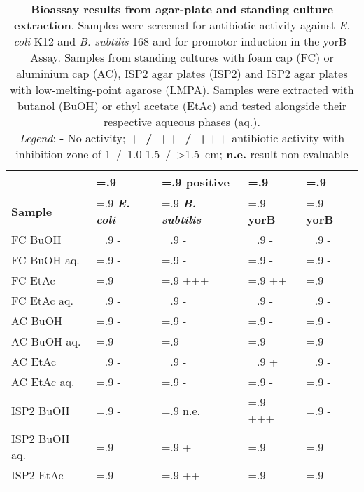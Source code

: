     \begin{table}[htbp]
        \caption[Bioassay results from agar-plate and standing culture extraction]{%
        	\textbf{Bioassay results from agar-plate and standing culture extraction}.
	        Samples were screened for antibiotic activity against \textit{E. coli} K12 and \textit{B. subtilis} 168 and for promotor induction in the yorB-Assay.
	        Samples from standing cultures with foam cap (FC) or aluminium cap (AC), ISP2 agar plates (ISP2) and ISP2 agar plates with low-melting-point agarose (LMPA).
	        Samples were extracted with butanol (BuOH) or ethyl acetate (EtAc) and tested alongside their respective aqueous phases (aq.).\\
	        \emph{Legend}: \textbf{-} No activity; \textbf{+~/~++~/~+++} antibiotic activity with inhibition zone of 1~/~1.0-1.5~/~>1.5~cm; \textbf{n.e.} result non-evaluable}
        \label{tab:yorB_assay_results}
        \centering
        \begin{tabularx}{\textwidth}{>{\hsize=1.4\hsize}X>{\hsize=.9\hsize}X>{\hsize=.9\hsize}X>{\hsize=.9\hsize}X>{\hsize=.9\hsize}X}
            \toprule
            & \multicolumn{3}{c}{Antibacterial} & positive \\
            \cline{2-4}
            \textbf{Sample} & \textbf{\textit{E. coli}}     & \textbf{\textit{B. subtilis}}  & \textbf{yorB}  & \textbf{yorB}    \\
            \midrule
            FC BuOH         & -     & -     & -     & -    \\
            FC BuOH aq.     & -     & -     & -     & -    \\
            FC EtAc         & -     & +++   & ++    & -    \\
            FC EtAc aq.     & -     & -     & -     & -    \\
            AC BuOH         & -     & -     & -     & -    \\
            AC BuOH aq.     & -     & -     & -     & -    \\
            AC EtAc         & -     & -     & +     & -    \\
            AC EtAc aq.     & -     & -     & -     & -    \\
            \midrule
            ISP2 BuOH       & -     & n.e.  & +++   & -    \\
            ISP2 BuOH aq.   & -     & +     & -     & -    \\
            ISP2 EtAc       & -     & ++    & -     & -    \\

\end{tabularx}
\end{table}
